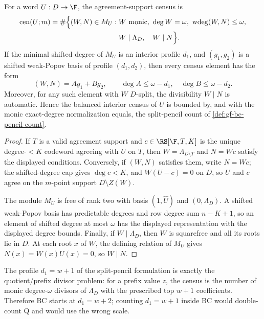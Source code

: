 \begin{proposition}
\label{prop:gf-bc-lattice-split}
For a word \(U:D\to\F\), the agreement-support census is
\[
\begin{aligned}
        \mathrm{cen}(U;m)
        =\#\Bigl\{(W,N)\in M_U:\;&
        W\text{ monic},\ \deg W=\omega,\
        \operatorname{wdeg}(W,N)\le\omega,\\
        &W\mid\Lambda_D,\quad W\mid N
        \Bigr\}.
\end{aligned}
\]
If the minimal shifted degree of \(M_U\) is an interior profile \(d_1\), and
\((g_1,g_2)\) is a shifted weak-Popov basis of profile \((d_1,d_2)\), then
every census element has the form
\[
        (W,N)=A g_1+B g_2,\qquad
        \deg A\le\omega-d_1,\quad \deg B\le\omega-d_2 .
\]
Moreover, for any such element with \(W\) \(D\)-split, the divisibility
\(W\mid N\) is automatic.  Hence the balanced interior census of \(U\) is
bounded by, and with the monic exact-degree normalization equals, the
split-pencil count of \cref{def:gf-bc-pencil-count}.
\end{proposition}

\begin{proof}
If \(T\) is a valid agreement support and \(c\in\RS[\F,T,K]\) is the unique
degree-\(<K\) codeword agreeing with \(U\) on \(T\), then
\(W=\Lambda_{D\setminus T}\) and \(N=Wc\) satisfy the displayed conditions.
Conversely, if \((W,N)\) satisfies them, write \(N=Wc\); the shifted-degree
cap gives \(\deg c<K\), and \(W(U-c)=0\) on \(D\), so \(U\) and \(c\) agree
on the \(m\)-point support \(D\setminus Z(W)\).

The module \(M_U\) is free of rank two with basis \((1,\widehat U)\) and
\((0,\Lambda_D)\).  A shifted weak-Popov basis has predictable degrees and row
degree sum \(n-K+1\), so an element of shifted degree at most \(\omega\) has
the displayed representation with the displayed degree bounds.  Finally, if
\(W\mid\Lambda_D\), then \(W\) is squarefree and all its roots lie in \(D\).
At each root \(x\) of \(W\), the defining relation of \(M_U\) gives
\(N(x)=W(x)U(x)=0\), so \(W\mid N\).
\end{proof}

\begin{proposition}
\label{prop:gf-bc-boundary-is-q}
The profile \(d_1=w+1\) of the split-pencil formulation is exactly the
quotient/prefix divisor problem: for a prefix value \(z\), the census is the
number of monic degree-\(\omega\) divisors of \(\Lambda_D\) with the prescribed
top \(w+1\) coefficients.  Therefore BC starts at \(d_1=w+2\); counting
\(d_1=w+1\) inside BC would double-count Q and would use the wrong scale.
\end{proposition}


